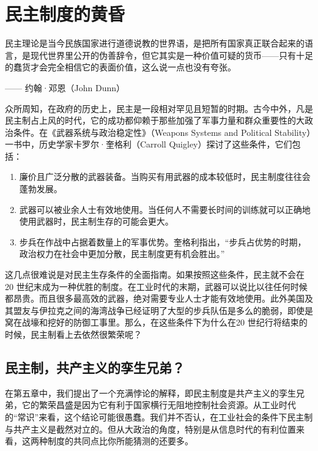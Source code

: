\chapter{民主制度的黄昏}

\begin{tcolorbox}
\kaishu 民主理论是当今民族国家进行道德说教的世界语，是把所有国家真正联合起来的语言，是现代世界里公开的伪善辞令，但它其实是一种价值可疑的货币——只有十足的蠢货才会完全相信它的表面价值，这么说一点也没有夸张。
\begin{flushright}
—— 约翰·邓恩（John Dunn）
\end{flushright}
\end{tcolorbox}


众所周知，在政府的历史上，民主是一段相对罕见且短暂的时期。古今中外，凡是民主制占上风的时代，它的成功都仰赖于那些加强了军事力量和群众重要性的大政治条件。在《武器系统与政治稳定性》（Weapons Systems and Political Stability）一书中，历史学家卡罗尔·奎格利（Carroll Quigley）探讨了这些条件，它们包括：

\begin{enumerate}
    \item 廉价且广泛分散的武器装备。当购买有用武器的成本较低时，民主制度往往会蓬勃发展。
    \item 武器可以被业余人士有效地使用。当任何人不需要长时间的训练就可以正确地使用武器时，民主制生存的可能会更大。
    \item 步兵在作战中占据着数量上的军事优势。奎格利指出，“步兵占优势的时期，政治权力在社会中更加分散，民主制度更有机会胜出。” 
\end{enumerate}

这几点很难说是对民主生存条件的全面指南。如果按照这些条件，民主就不会在 20 世纪末成为一种优胜的制度。在工业时代的末期，武器可以说比以往任何时候都昂贵。而且很多最高效的武器，绝对需要专业人士才能有效地使用。此外美国及其盟友与伊拉克之间的海湾战争已经证明了大型的步兵队伍是多么的脆弱，即使是窝在战壕和挖好的防御工事里。那么，在这些条件下为什么在20 世纪行将结束的时候，民主制看上去依然很繁荣呢？

\section{民主制，共产主义的孪生兄弟？}
在第五章中，我们提出了一个充满悖论的解释，即民主制度是共产主义的孪生兄弟，它的繁荣昌盛是因为它有利于国家横行无阻地控制社会资源。从工业时代的“常识”来看，这个结论可能很愚蠢。我们并不否认，在工业社会的条件下民主制与共产主义是截然对立的。但从大政治的角度，特别是从信息时代的有利位置来看，这两种制度的共同点比你所能猜测的还要多。

